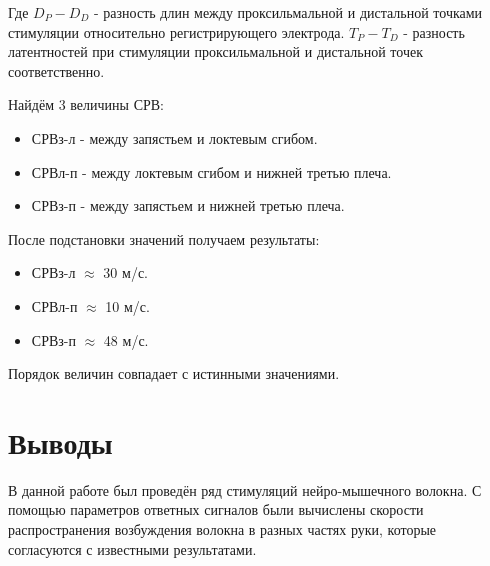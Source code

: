 \documentclass{article}
\begin{document}
                    Где $D_{P} - D_{D}$ - разность длин между проксильмальной и дистальной точками стимуляции относительно
                    регистрирующего электрода. $T_{P} - T_{D}$ - разность латентностей при стимуляции проксильмальной и
                    дистальной точек соответственно.

                    Найдём 3 величины СРВ:

                    \begin{itemize}
                        \item СРВ{з-л} - между запястьем и локтевым сгибом.
                        \item СРВ{л-п} - между локтевым сгибом и нижней третью плеча.
                        \item СРВ{з-п} - между запястьем и нижней третью плеча.
                    \end{itemize}
                    \newpage

                    После подстановки значений получаем результаты:

                    \begin{itemize}
                        \item СРВ{з-л} $\approx$ 30 м/с.
                        \item СРВ{л-п} $\approx$ 10 м/с.
                        \item СРВ{з-п} $\approx$ 48 м/с.
                    \end{itemize}

                    Порядок величин совпадает с истинными значениями.

    \section*{Выводы}

        \hspace*{4mm} В данной работе был проведён ряд стимуляций нейро-мышечного волокна. С помощью параметров
        ответных сигналов были вычислены скорости распространения возбуждения волокна в разных частях руки, которые
        согласуются с известными результатами.
\end{document}
